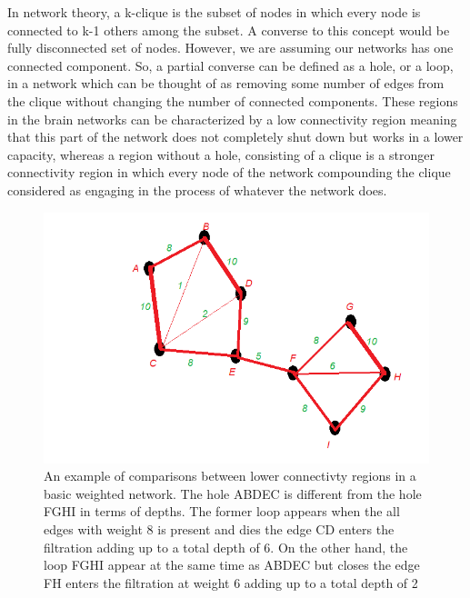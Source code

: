 \documentclass[9pt,twocolumn,twoside,lineno]{pnas-new}
\begin{document}
  In network theory, a k-clique is the subset of nodes in which every node is connected to k-1 others among the subset. A converse to this concept would be fully disconnected set of nodes. However, we are assuming our networks has one connected component. So, a partial converse can be defined as a hole, or a loop, in a network which can be thought of as removing some number of edges from the clique without changing the number of connected components. These regions in the brain networks can be characterized by a low connectivity region meaning that this part of the network does not completely shut down but works in a lower capacity, whereas a region without a hole, consisting of a clique is a stronger connectivity region in which every node of the network compounding the clique considered as engaging in the process of whatever the network does.
  
\begin{figure}%
\centering
\includegraphics[width=.8\linewidth]{lower_connectivity.png}
\caption{An example of comparisons between lower connectivty regions in a basic weighted network. The hole ABDEC is different from the hole FGHI in terms of depths. The former  loop appears when the all edges with weight 8 is present and dies the edge CD enters the filtration adding up to a total depth of 6. On the other hand, the loop FGHI appear at the same time as ABDEC but closes the edge FH enters the filtration at weight 6 adding up to a total depth of 2}
\label{fig:connectivty}
\end{figure}
\end{document}
